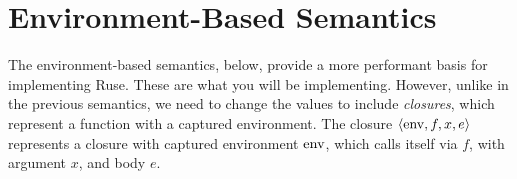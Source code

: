 \documentclass{homework}
\begin{document}

\section{Environment-Based Semantics}

The environment-based semantics, below, provide a more performant basis for implementing Ruse.
These are what you will be implementing.
However, unlike in the previous semantics, we need to change the values to include \emph{closures}, which represent a function with a captured environment.
The closure $\langle\text{env}, f, x, e \rangle$ represents a closure with captured environment $\text{env}$, which calls itself via $f$, with argument $x$, and body $e$.
\end{document}
